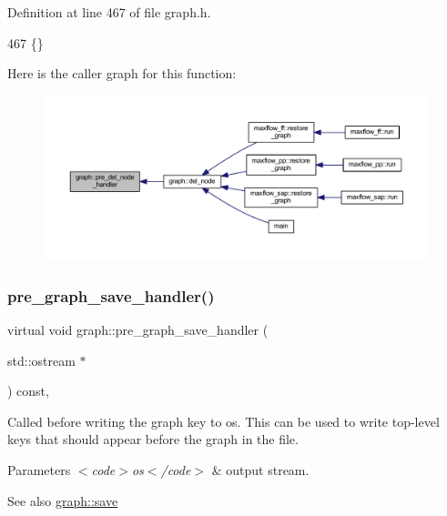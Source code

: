 Definition at line 467 of file graph.\+h.


\begin{DoxyCode}
467 \{\}      
\end{DoxyCode}
Here is the caller graph for this function\+:
\nopagebreak
\begin{figure}[H]
\begin{center}
\leavevmode
\includegraphics[width=350pt]{classgraph_a64699c6cb14cdedab5e13232a8f3e754_icgraph}
\end{center}
\end{figure}
\mbox{\label{classgraph_ab257e02f6fd04fef244032a3a15bec9f}} 
\subsubsection{\texorpdfstring{pre\+\_\+graph\+\_\+save\+\_\+handler()}{pre\_graph\_save\_handler()}}
{\footnotesize\ttfamily virtual void graph\+::pre\+\_\+graph\+\_\+save\+\_\+handler (\begin{DoxyParamCaption}\item[{std\+::ostream $\ast$}]{ }\end{DoxyParamCaption}) const\hspace{0.3cm}{\ttfamily [inline]}, {\ttfamily [virtual]}}

Called before writing the graph key to {\ttfamily os}. This can be used to write top-\/level keys that should appear before the graph in the file.


\begin{DoxyParams}{Parameters}
{\em $<$code$>$os$<$/code$>$} & output stream. \\
\hline
\end{DoxyParams}
\begin{DoxySeeAlso}{See also}
\mbox{\hyperlink{classgraph_a7bd0712a528249d1585085a64ac3e661}{graph\+::save}} 
\end{DoxySeeAlso}


